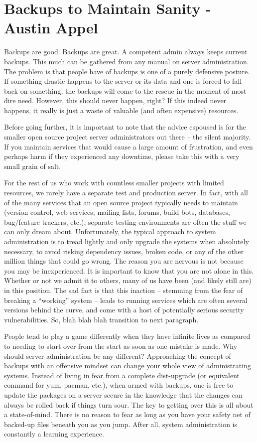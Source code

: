 \chapter{Backups to Maintain Sanity - Austin Appel}
Backups are good. Backups are great. A competent admin always keeps current
backups.  This much can be gathered from any manual on server administration.
The problem is that people have of backups is one of a purely defensive posture.
If something drastic happens to the server or its data and one is forced to fall
back on something, the backups will come to the rescue in the moment of most
dire need. However, this should never happen, right?  If this indeed never
happens, it really is just a waste of valuable (and often expensive) resources.

Before going further, it is important to note that the advice espoused is for
the smaller open source project server administrators out there -- the silent
majority. If you maintain services that would cause a large amount of
frustration, and even perhaps harm if they experienced any downtime, please take
this with a very small grain of salt.

For the rest of us who work with countless smaller projects with limited
resources, we rarely have a separate test and production server. In fact, with
all of the many services that an open source project typically needs to maintain
(version control, web services, mailing lists, forums, build bots, databases,
bug/feature trackers, etc.), separate testing environments are often the stuff
we can only dream about. Unfortunately, the typical approach to system
administration is to tread lightly and only upgrade the systems when absolutely
necessary, to avoid risking dependency issues, broken code, or any of the other
million things that could go wrong. The reason you are nervous is not because
you may be inexperienced. It is important to know that you are not alone in
this. Whether or not we admit it to others, many of us have been (and likely
still are) in this position. The sad fact is that this inaction -- stemming from
the fear of breaking a ``working'' system -- leads to running services which are
often several versions behind the curve, and come with a host of potentially
serious security vulnerabilities. So, blah blah blah transition to next
paragraph.

People tend to play a game differently when they have infinite lives as compared
to needing to start over from the start as soon as one mistake is made. Why
should server administration be any different? Approaching the concept of
backups with an offensive mindset can change your whole view of administrating
systems. Instead of living in fear from a complete dist-upgrade (or equivalent
command for yum, pacman, etc.), when armed with backups, one is free to update
the packages on a server secure in the knowledge that the changes can always be
rolled back if things turn sour. The key to getting over this is all about a
state-of-mind. There is no reason to fear as long as you have your safety net of
backed-up files beneath you as you jump. After all, system administration is
constantly a learning experience.

